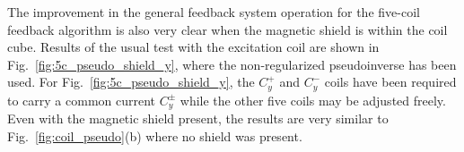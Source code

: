 The improvement in the general feedback system operation for the
five-coil feedback algorithm is also very clear when the magnetic
shield is within the coil cube.  Results of the usual test with the
excitation coil are shown in Fig.~\ref{fig:5c_pseudo_shield_y}, where
the non-regularized pseudoinverse has been used.  For
Fig.~\ref{fig:5c_pseudo_shield_y}, the $C_y^+$ and $C_y^-$ coils have
been required to carry a common current $C_y^\pm$ while the other five
coils may be adjusted freely.  Even with the magnetic shield present,
the results are very similar to Fig.~\ref{fig:coil_pseudo}(b) where no
shield was present.




 





